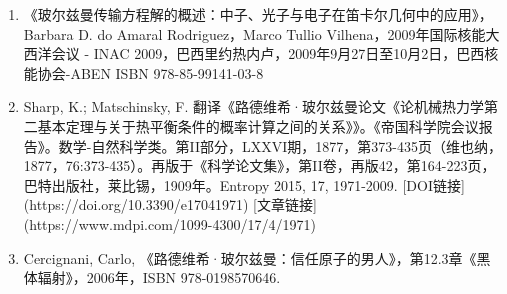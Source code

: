 \begin{enumerate}
\item 《玻尔兹曼传输方程解的概述：中子、光子与电子在笛卡尔几何中的应用》，Barbara D. do Amaral Rodriguez，Marco Tullio Vilhena，2009年国际核能大西洋会议 - INAC 2009，巴西里约热内卢，2009年9月27日至10月2日，巴西核能协会-ABEN ISBN 978-85-99141-03-8  
\item Sharp, K.; Matschinsky, F. 翻译《路德维希·玻尔兹曼论文《论机械热力学第二基本定理与关于热平衡条件的概率计算之间的关系》》。《帝国科学院会议报告》。数学-自然科学类。第II部分，LXXVI期，1877，第373-435页（维也纳，1877，76:373-435）。再版于《科学论文集》，第II卷，再版42，第164-223页，巴特出版社，莱比锡，1909年。Entropy 2015, 17, 1971-2009. [DOI链接](https://doi.org/10.3390/e17041971) [文章链接](https://www.mdpi.com/1099-4300/17/4/1971)  
\item Cercignani, Carlo, 《路德维希·玻尔兹曼：信任原子的男人》，第12.3章《黑体辐射》，2006年，ISBN 978-0198570646.
\end{enumerate}
